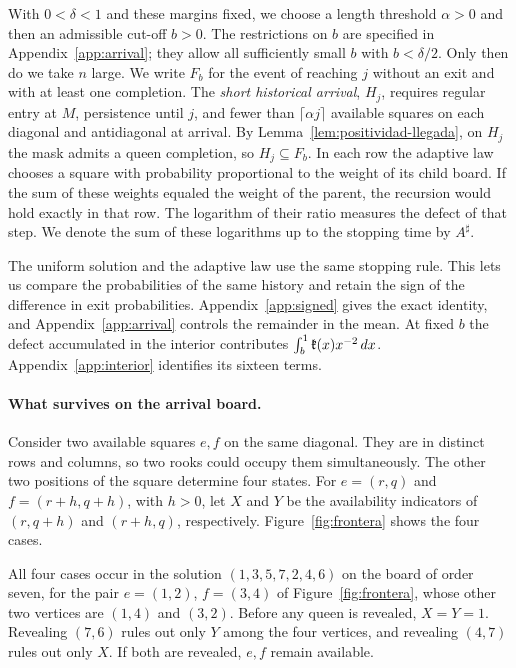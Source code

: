 With \(0<\delta<1\) and these margins fixed, we choose a length threshold \(\alpha>0\) and then an
admissible cut-off \(b>0\). The restrictions on \(b\) are specified in Appendix~\ref{app:arrival}; they
allow all sufficiently small \(b\) with \(b<\delta/2\). Only then do we take \(n\) large. We write
\(F_b\) for the event of reaching \(j\) without an exit and with at least one completion. The \emph{short
historical arrival}, \(H_j\), requires regular entry at \(M\), persistence until \(j\), and fewer than
\(\lceil\alpha j\rceil\) available squares on each diagonal and antidiagonal at arrival. By
Lemma~\ref{lem:positividad-llegada}, on \(H_j\) the mask admits a queen completion, so \(H_j\subseteq
F_b\). In each row the adaptive law chooses a square with probability proportional to the weight of its
child board. If the sum of these weights equaled the weight of the parent, the recursion would hold
exactly in that row. The logarithm of their ratio measures the defect of that step. We denote the sum of
these logarithms up to the stopping time by \(A^\sharp\).

The uniform solution and the adaptive law use the same stopping rule. This lets us compare the
probabilities of the same history and retain the sign of the difference in exit probabilities.
Appendix~\ref{app:signed} gives the exact identity, and Appendix~\ref{app:arrival} controls the remainder
in the mean. At fixed \(b\) the defect accumulated in the interior contributes \(\int_b^1
\mathfrak{k}(x)x^{-2}\,dx\). Appendix~\ref{app:interior} identifies its sixteen terms.

\paragraph{What survives on the arrival board.} Consider two available squares \(e,f\) on the same
diagonal. They are in distinct rows and columns, so two rooks could occupy them simultaneously. The other
two positions of the square determine four states. For \(e=(r,q)\) and \(f=(r+h,q+h)\), with \(h>0\), let
\(X\) and \(Y\) be the availability indicators of \((r,q+h)\) and \((r+h,q)\), respectively.
Figure~\ref{fig:frontera} shows the four cases.


All four cases occur in the solution \((1,3,5,7,2,4,6)\) on the board of order seven, for the pair
\(e=(1,2)\), \(f=(3,4)\) of Figure~\ref{fig:frontera}, whose other two vertices are \((1,4)\) and
\((3,2)\). Before any queen is
revealed, \(X=Y=1\). Revealing \((7,6)\) rules out only \(Y\) among the four vertices, and revealing
\((4,7)\) rules out only \(X\). If both are revealed, \(e,f\) remain available.

